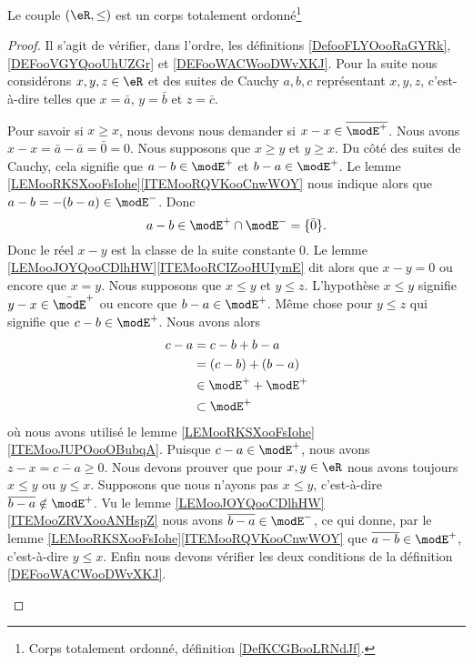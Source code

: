 \begin{proposition} \label{PROPooYMJVooNAsXae}
	Le couple \( (\eR,\leq)\) est un corps totalement ordonné\footnote{Corps totalement ordonné, définition \ref{DefKCGBooLRNdJf}.}
\end{proposition}

\begin{proof}
	Il s'agit de vérifier, dans l'ordre, les définitions \ref{DefooFLYOooRaGYRk}, \ref{DEFooVGYQooUhUZGr} et \ref{DEFooWACWooDWvXKJ}. Pour la suite nous considérons \( x,y,z\in \eR\) et des suites de Cauchy \( a,b,c\) représentant \( x,y,z\), c'est-à-dire telles que \( x=\bar a\), \( y=\bar b\) et \( z=\bar c\).
	\begin{subproof}
		\spitem[Réflexivité]
		Pour savoir si \( x\geq x\), nous devons nous demander si \( x-x\in\overline{ \modE^+ }\). Nous avons \( x-x=\bar a-\bar a=\bar 0=0\).
		\spitem[antisymétrie]
		Nous supposons que \( x\geq y\) et \( y\geq x\). Du côté des suites de Cauchy, cela signifie que \( a-b\in\modE^+\) et \( b-a\in \modE^+\). Le lemme \ref{LEMooRKSXooFsIohe}\ref{ITEMooRQVKooCnwWOY} nous indique alors que \( a-b=-(b-a)\in \modE^-\). Donc
		\begin{equation}
			a-b\in\modE^+\cap\modE^-=\{ \bar 0 \}.
		\end{equation}
		Donc le réel \( x-y\) est la classe de la suite constante \( 0\). Le lemme \ref{LEMooJOYQooCDlhHW}\ref{ITEMooRCIZooHUIymE} dit alors que \( x-y=0\) ou encore que \( x=y\).
		\spitem[transitivité]
		Nous supposons que \( x\leq y\) et \( y\leq z\). L'hypothèse \( x\leq y\) signifie \( y-x\in\bar\modE^+\) ou encore que \( b-a\in\modE^+\). Même chose pour \( y\leq z\) qui signifie que \( c-b\in\modE^+\). Nous avons alors
		\begin{subequations}
			\begin{align}
				c-a & =c-b+b-a            \\
				    & =(c-b)+(b-a)        \\
				    & \in \modE^++\modE^+ \\
				    & \subset \modE^+
			\end{align}
		\end{subequations}
		où nous avons utilisé le lemme \ref{LEMooRKSXooFsIohe}\ref{ITEMooJUPOooOBubqA}. Puisque \( c-a\in\modE^+\), nous avons \( z-x=\overline{ c-a }\geq 0\).
		Nous devons prouver que pour \( x,y\in \eR\) nous avons toujours \( x\leq y\) ou \( y\leq x\). Supposons que nous n'ayons pas \( x\leq y\), c'est-à-dire \( \overline{ b-a }\notin \modE^+\). Vu le lemme \ref{LEMooJOYQooCDlhHW}\ref{ITEMooZRVXooANHspZ} nous avons \( \overline{ b-a }\in \modE^-\), ce qui donne, par le lemme \ref{LEMooRKSXooFsIohe}\ref{ITEMooRQVKooCnwWOY} que \( \overline{ a-b }\in \modE^+\), c'est-à-dire \( y\leq x\).
		Enfin nous devons vérifier les deux conditions de la définition \ref{DEFooWACWooDWvXKJ}.


\end{subproof}
\end{proof}
